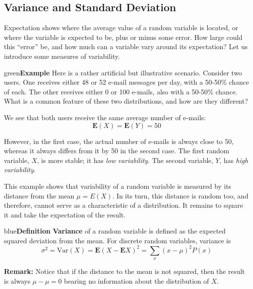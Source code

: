 \documentclass{article}
\newenvironment{example}[1]{\begin{mybox}{green}{\textbf{Example #1}}}{\end{mybox}}
\newenvironment{definition}[1]{\begin{mybox}{blue}{\textbf{Definition #1}}}{\end{mybox}}
\begin{document}
\subsection{Variance and Standard Deviation}

Expectation shows where the average value of a random variable is located, or where the variable is expected to be, plus or minus some error. How large could this ``error'' be, and how much can a variable vary around its expectation? Let us introduce some measures of variability.

\begin{example}{}
Here is a rather artificial but illustrative scenario. Consider two users. One receives either 48 or 52 e-mail messages per day, with a 50-50\% chance of each. The other receives either 0 or 100 e-mails, also with a 50-50\% chance. What is a common feature of these two distributions, and how are they different?

We see that both users receive the same average number of e-mails:
\begin{equation*}
    \mathbf{E}(X) = \mathbf{E}(Y) = 50
\end{equation*}

However, in the first case, the actual number of e-mails is always close to 50, whereas it always differs from it by 50 in the second case. The first random variable, $X$, is more stable; it has \textit{low variability}. The second variable, $Y$, has \textit{high variability}.
\end{example}

This example shows that variability of a random variable is measured by its distance from the mean $\mu = E(X)$. In its turn, this distance is random too, and therefore, cannot serve as a characteristic of a distribution. It remains to square it and take the expectation of the result.

\begin{definition}{}
\textbf{Variance} of a random variable is defined as the expected squared deviation from the mean. For discrete random variables, variance is
\begin{equation*}
    \sigma^2 = \text{Var}(X) = \mathbf{E}(X - \mathbf{E}X)^2 = \sum_{x} (x - \mu)^2 P(x) 
\end{equation*}
\end{definition}
\textbf{Remark:} Notice that if the distance to the mean is not squared, then the result is always $\mu - \mu = 0$ bearing no information about the distribution of $X$.
\end{document}
